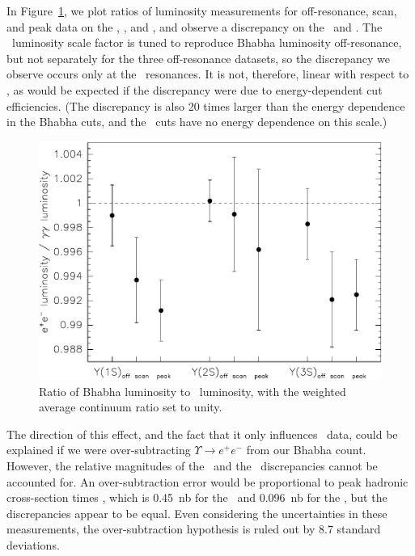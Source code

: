 \documentclass{cornell}
\begin{document}
\label{sec:luminosityconsistency}
In Figure~\ref{lumigamgam}, we plot ratios of luminosity measurements
for off-resonance, scan, and peak data on the \us, \uss, and \usss,
and observe a discrepancy on the \us\ and \usss.  The \gamgam\
luminosity scale factor is tuned to reproduce Bhabha luminosity
off-resonance, but not separately for the three off-resonance
datasets, so the discrepancy we observe occurs only at the \ups\
resonances.  It is not, therefore, linear with respect to \ecm, as
would be expected if the discrepancy were due to energy-dependent cut
efficiencies.  (The discrepancy is also 20 times larger than the
energy dependence in the Bhabha cuts, and the \gamgam\ cuts have no
energy dependence on this scale.)

\begin{figure}[p]
  \begin{center}
    \includegraphics[width=\linewidth]{newplots/lumigamgam}
  \end{center}
  \caption[Ratio of Bhabha luminosity to \gamgam\ luminosity through
  each resonance]{\label{lumigamgam} Ratio of Bhabha luminosity to
  \gamgam\ luminosity, with the weighted average continuum ratio set
  to unity.}
\end{figure}

The direction of this effect, and the fact that it only influences
\ups\ data, could be explained if we were over-subtracting $\Upsilon
\to e^+e^-$ from our Bhabha count.  However, the relative magnitudes
of the \us\ and the \usss\ discrepancies cannot be accounted for.  An
over-subtraction error would be proportional to peak hadronic
cross-section times \bee, which is 0.45~nb for the \us\ and 0.096~nb
for the \usss, but the discrepancies appear to be equal.  Even
considering the uncertainties in these measurements, the
over-subtraction hypothesis is ruled out by 8.7 standard deviations.
\end{document}

